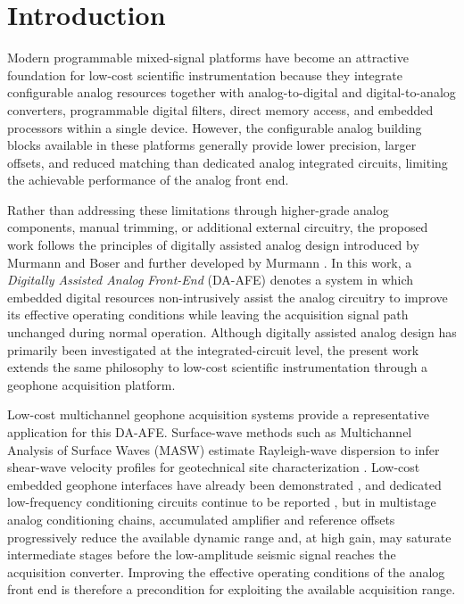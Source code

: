 \section{Introduction}

Modern programmable mixed-signal platforms have become an attractive foundation for low-cost scientific instrumentation because they integrate configurable analog resources together with analog-to-digital and digital-to-analog converters, programmable digital filters, direct memory access, and embedded processors within a single device. However, the configurable analog building blocks available in these platforms generally provide lower precision, larger offsets, and reduced matching than dedicated analog integrated circuits, limiting the achievable performance of the analog front end.

Rather than addressing these limitations through higher-grade analog components, manual trimming, or additional external circuitry, the proposed work follows the principles of digitally assisted analog design introduced by Murmann and Boser \cite{Murmann2004} and further developed by Murmann \cite{Murmann2006}. In this work, a \emph{Digitally Assisted Analog Front-End} (DA-AFE) denotes a system in which embedded digital resources non-intrusively assist the analog circuitry to improve its effective operating conditions while leaving the acquisition signal path unchanged during normal operation. Although digitally assisted analog design has primarily been investigated at the integrated-circuit level, the present work extends the same philosophy to low-cost scientific instrumentation through a geophone acquisition platform.

Low-cost multichannel geophone acquisition systems provide a representative application for this DA-AFE. Surface-wave methods such as Multichannel Analysis of Surface Waves (MASW) estimate Rayleigh-wave dispersion to infer shear-wave velocity profiles for geotechnical site characterization \cite{Park1999,Foti2014}. Low-cost embedded geophone interfaces have already been demonstrated \cite{Kafadar2020,Wijayaraja2024}, and dedicated low-frequency conditioning circuits continue to be reported \cite{Deng2025}, but in multistage analog conditioning chains, accumulated amplifier and reference offsets progressively reduce the available dynamic range and, at high gain, may saturate intermediate stages before the low-amplitude seismic signal reaches the acquisition converter. Improving the effective operating conditions of the analog front end is therefore a precondition for exploiting the available acquisition range.

